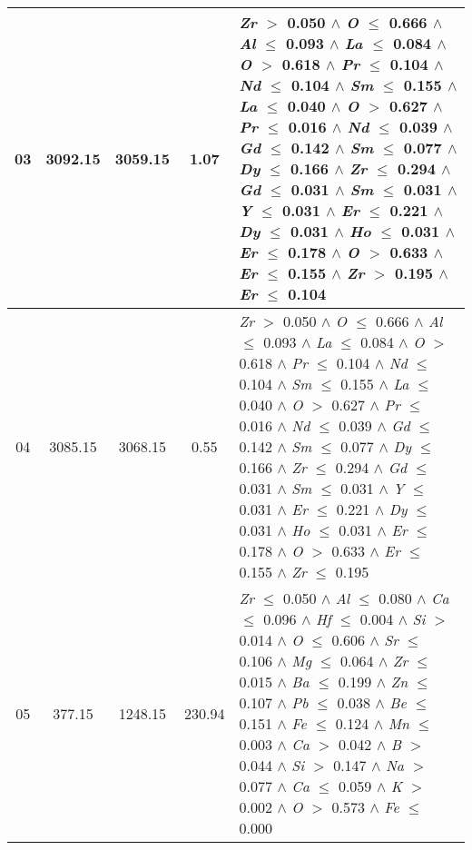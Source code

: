 \begin{table}[!htbp]
\begin{tabular}{ccccm{}}
		\hline
		03 & 3092.15 & 3059.15 & 1.07 & \textit{Zr} $>$ 0.050 $\wedge$ \textit{O} $\le$ 0.666 $\wedge$ \textit{Al} $\le$ 0.093 $\wedge$ \textit{La} $\le$ 0.084 $\wedge$ \textit{O} $>$ 0.618 $\wedge$ \textit{Pr} $\le$ 0.104 $\wedge$ \textit{Nd} $\le$ 0.104 $\wedge$ \textit{Sm} $\le$ 0.155 $\wedge$ \textit{La} $\le$ 0.040 $\wedge$ \textit{O} $>$ 0.627 $\wedge$ \textit{Pr} $\le$ 0.016 $\wedge$ \textit{Nd} $\le$ 0.039 $\wedge$ \textit{Gd} $\le$ 0.142 $\wedge$ \textit{Sm} $\le$ 0.077 $\wedge$ \textit{Dy} $\le$ 0.166 $\wedge$ \textit{Zr} $\le$ 0.294 $\wedge$ \textit{Gd} $\le$ 0.031 $\wedge$ \textit{Sm} $\le$ 0.031 $\wedge$ \textit{Y} $\le$ 0.031 $\wedge$ \textit{Er} $\le$ 0.221 $\wedge$ \textit{Dy} $\le$ 0.031 $\wedge$ \textit{Ho} $\le$ 0.031 $\wedge$ \textit{Er} $\le$ 0.178 $\wedge$ \textit{O} $>$ 0.633 $\wedge$ \textit{Er} $\le$ 0.155 $\wedge$ \textit{Zr} $>$ 0.195 $\wedge$ \textit{Er} $\le$ 0.104\\
		\hline
		04 & 3085.15 & 3068.15 & 0.55 & \textit{Zr} $>$ 0.050 $\wedge$ \textit{O} $\le$ 0.666 $\wedge$ \textit{Al} $\le$ 0.093 $\wedge$ \textit{La} $\le$ 0.084 $\wedge$ \textit{O} $>$ 0.618 $\wedge$ \textit{Pr} $\le$ 0.104 $\wedge$ \textit{Nd} $\le$ 0.104 $\wedge$ \textit{Sm} $\le$ 0.155 $\wedge$ \textit{La} $\le$ 0.040 $\wedge$ \textit{O} $>$ 0.627 $\wedge$ \textit{Pr} $\le$ 0.016 $\wedge$ \textit{Nd} $\le$ 0.039 $\wedge$ \textit{Gd} $\le$ 0.142 $\wedge$ \textit{Sm} $\le$ 0.077 $\wedge$ \textit{Dy} $\le$ 0.166 $\wedge$ \textit{Zr} $\le$ 0.294 $\wedge$ \textit{Gd} $\le$ 0.031 $\wedge$ \textit{Sm} $\le$ 0.031 $\wedge$ \textit{Y} $\le$ 0.031 $\wedge$ \textit{Er} $\le$ 0.221 $\wedge$ \textit{Dy} $\le$ 0.031 $\wedge$ \textit{Ho} $\le$ 0.031 $\wedge$ \textit{Er} $\le$ 0.178 $\wedge$ \textit{O} $>$ 0.633 $\wedge$ \textit{Er} $\le$ 0.155 $\wedge$ \textit{Zr} $\le$ 0.195\\
		\hline
		05 & 377.15 & 1248.15 & 230.94 & \textit{Zr} $\le$ 0.050 $\wedge$ \textit{Al} $\le$ 0.080 $\wedge$ \textit{Ca} $\le$ 0.096 $\wedge$ \textit{Hf} $\le$ 0.004 $\wedge$ \textit{Si} $>$ 0.014 $\wedge$ \textit{O} $\le$ 0.606 $\wedge$ \textit{Sr} $\le$ 0.106 $\wedge$ \textit{Mg} $\le$ 0.064 $\wedge$ \textit{Zr} $\le$ 0.015 $\wedge$ \textit{Ba} $\le$ 0.199 $\wedge$ \textit{Zn} $\le$ 0.107 $\wedge$ \textit{Pb} $\le$ 0.038 $\wedge$ \textit{Be} $\le$ 0.151 $\wedge$ \textit{Fe} $\le$ 0.124 $\wedge$ \textit{Mn} $\le$ 0.003 $\wedge$ \textit{Ca} $>$ 0.042 $\wedge$ \textit{B} $>$ 0.044 $\wedge$ \textit{Si} $>$ 0.147 $\wedge$ \textit{Na} $>$ 0.077 $\wedge$ \textit{Ca} $\le$ 0.059 $\wedge$ \textit{K} $>$ 0.002 $\wedge$ \textit{O} $>$ 0.573 $\wedge$ \textit{Fe} $\le$ 0.000\\

\end{tabular}
\end{table}
